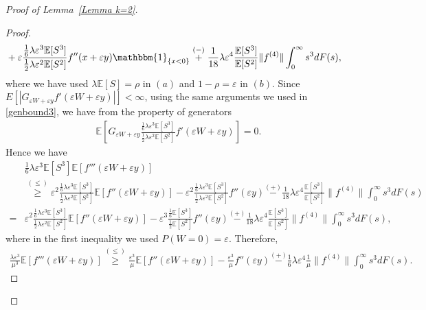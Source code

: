 \documentclass[10pt,a4paper]{amsart}
\begin{document}
\begin{proof}[Proof of Lemma~\ref{Lemma k=2}]
\begin{proof}
\begin{align*}
    &+\varepsilon \frac{\frac{1}{6}\lambda \varepsilon^3 \mathbb E[S^3]}{\frac{1}{2}\lambda \varepsilon^2 \mathbb E[S^2]} f''(x+\varepsilon y)\mathbbm{1}_{\{x<0\}}\stackrel{(-)}{+}\frac{1}{18} \lambda \varepsilon^4 \frac{\mathbb E[S^3]}{\mathbb E[S^2]} \|f^{(4)}\|\int_0^\infty s^3 dF(s),
\end{align*}
where we have used $\lambda \mathbb E[S]=\rho$ in $(a)$ and $1-\rho=\varepsilon$ in $(b)$. Since $E\left[| G_{\varepsilon W+\varepsilon y}f'(\varepsilon W+\varepsilon y)|\right]< \infty$, using the same arguments we used in \eqref{genbound3}, we have from the property of generators
\begin{align*}
   \mathbb E\left[ G_{\varepsilon W+\varepsilon y}\frac{\frac{1}{6}\lambda \varepsilon^3 \mathbb E[S^3]}{\frac{1}{2}\lambda \varepsilon^2 \mathbb E[S^2]}f'(\varepsilon W+\varepsilon y)\right]=0.
\end{align*}
Hence we have
\begin{align*}
    &\frac{1}{6}\lambda \varepsilon^3 \mathbb E[S^3]\mathbb E[f'''(\varepsilon W+\varepsilon y)]\\ &\stackrel{(\leq)} {\geq} \varepsilon^2\frac{\frac{1}{6}\lambda \varepsilon^3 \mathbb E[S^3]}{\frac{1}{2}\lambda \varepsilon^2 \mathbb E[S^2]}\mathbb E[f''(\varepsilon W+\varepsilon y)]-\varepsilon^2 \frac{\frac{1}{6}\lambda \varepsilon^3 \mathbb E[S^3]}{\frac{1}{2}\lambda \varepsilon^2 \mathbb E[S^2]} f''(\varepsilon y)       \stackrel{(+)}{-}\frac{1}{18} \lambda \varepsilon^4 \frac{\mathbb E[S^3]}{\mathbb E[S^2]} \|f^{(4)}\|\int_0^\infty s^3 dF(s)\\
        =  &\varepsilon^2\frac{\frac{1}{6}\lambda \varepsilon^3 \mathbb E[S^3]}{\frac{1}{2}\lambda \varepsilon^2 \mathbb E[S^2]}\mathbb E[f''(\varepsilon W+\varepsilon y)]-\varepsilon^3\frac{\frac{1}{6}\mathbb E[S^3]}{\frac{1}{2} \mathbb E[S^2]} f''(\varepsilon y)
        \stackrel{(+)}{-}\frac{1}{18} \lambda \varepsilon^4 \frac{\mathbb E[S^3]}{\mathbb E[S^2]} \|f^{(4)}\|\int_0^\infty s^3 dF(s),
\end{align*}
where in the first inequality we used $P(W=0)=\varepsilon$. Therefore,
\begin{align}\label{stg2}
    \frac{\lambda \varepsilon^3}{\mu^3}\mathbb E[f'''(\varepsilon W+\varepsilon y)] \stackrel{(\leq)} {\geq} \frac{\varepsilon^3}{\mu}\mathbb E[f''(\varepsilon W+\varepsilon y)]-\frac{\varepsilon^3}{\mu}f''(\varepsilon y)\stackrel{(+)}{-}\frac{1}{6} \lambda \varepsilon^4 \frac{1}{\mu} \|f^{(4)}\|\int_0^\infty s^3 dF(s).
\end{align}
\end{proof}

\end{proof}
\end{document}
